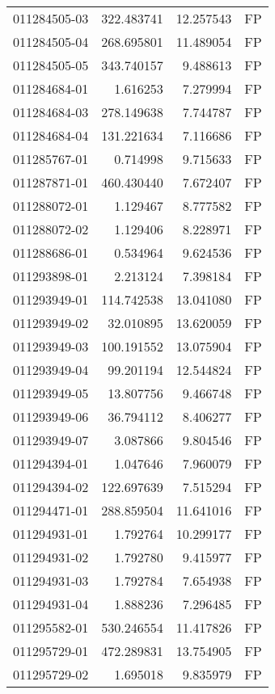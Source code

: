 \begin{tabular}{lrrl}
011284505-03 &  322.483741 &    12.257543 &   FP \\
011284505-04 &  268.695801 &    11.489054 &   FP \\
011284505-05 &  343.740157 &     9.488613 &   FP \\
011284684-01 &    1.616253 &     7.279994 &   FP \\
011284684-03 &  278.149638 &     7.744787 &   FP \\
011284684-04 &  131.221634 &     7.116686 &   FP \\
011285767-01 &    0.714998 &     9.715633 &   FP \\
011287871-01 &  460.430440 &     7.672407 &   FP \\
011288072-01 &    1.129467 &     8.777582 &   FP \\
011288072-02 &    1.129406 &     8.228971 &   FP \\
011288686-01 &    0.534964 &     9.624536 &   FP \\
011293898-01 &    2.213124 &     7.398184 &   FP \\
011293949-01 &  114.742538 &    13.041080 &   FP \\
011293949-02 &   32.010895 &    13.620059 &   FP \\
011293949-03 &  100.191552 &    13.075904 &   FP \\
011293949-04 &   99.201194 &    12.544824 &   FP \\
011293949-05 &   13.807756 &     9.466748 &   FP \\
011293949-06 &   36.794112 &     8.406277 &   FP \\
011293949-07 &    3.087866 &     9.804546 &   FP \\
011294394-01 &    1.047646 &     7.960079 &   FP \\
011294394-02 &  122.697639 &     7.515294 &   FP \\
011294471-01 &  288.859504 &    11.641016 &   FP \\
011294931-01 &    1.792764 &    10.299177 &   FP \\
011294931-02 &    1.792780 &     9.415977 &   FP \\
011294931-03 &    1.792784 &     7.654938 &   FP \\
011294931-04 &    1.888236 &     7.296485 &   FP \\
011295582-01 &  530.246554 &    11.417826 &   FP \\
011295729-01 &  472.289831 &    13.754905 &   FP \\
011295729-02 &    1.695018 &     9.835979 &   FP \\

\end{tabular}
